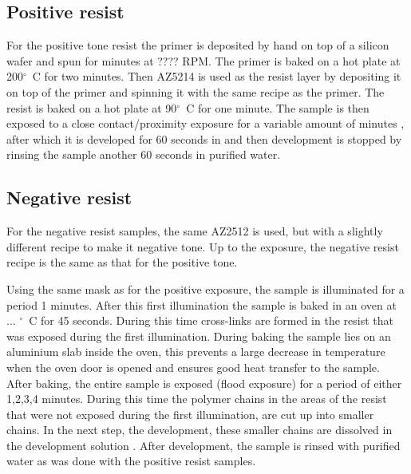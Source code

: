 \subsection*{Positive resist}
For the positive tone resist the primer  is deposited by hand on top of a silicon wafer and spun for  minutes at ???? RPM. The primer is baked on a hot plate at 200$^{\circ}$~C for two minutes. Then AZ5214  is used as the resist layer by depositing it on top of the primer and spinning it with the same recipe as the primer. The resist is baked on a hot plate at 90$^{\circ}$~C for one minute. The sample is then exposed to a close contact/proximity  exposure for a variable amount of minutes , after which it is developed for 60 seconds in  and then development is stopped by rinsing the sample another 60 seconds in purified water.

\subsection*{Negative resist}
For the negative resist samples, the same AZ2512 is used, but with a slightly different recipe to make it negative tone. Up to the exposure, the negative resist recipe is the same as that for the positive tone. 

Using the same mask as for the positive exposure, the sample is illuminated for a period 1  minutes. After this first illumination the sample is baked in an oven at ...  $^\circ$~C for 45 seconds. During this time cross-links are formed in the resist that was exposed during the first illumination. During baking the sample lies on an aluminium slab inside the oven, this prevents a large decrease in temperature when the oven door is opened and ensures good heat transfer to the sample. After baking, the entire sample is exposed (flood exposure) for a period of either 1,2,3,4  minutes. During this time the polymer chains in the areas of the resist that were not exposed during the first illumination, are cut up into smaller chains. In the next step, the development, these smaller chains are dissolved in the development solution . After development, the sample is rinsed with purified water as was done with the positive resist samples.